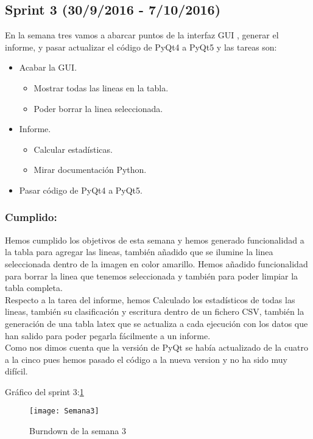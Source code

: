 \subsection{Sprint 3 (30/9/2016 - 7/10/2016)}
En la semana tres vamos a abarcar puntos de la interfaz GUI , generar el informe, y pasar actualizar  el código de PyQt4 a PyQt5 y las tareas son:

\begin{itemize}
	\item Acabar la GUI.
		\begin{itemize}
			\item Mostrar todas las lineas en la tabla.
			\item Poder borrar la linea seleccionada.
		\end{itemize} 
	\item Informe.
		\begin{itemize}
			\item Calcular estadísticas.
			\item Mirar documentación Python.
		\end{itemize}
	\item Pasar código de PyQt4 a PyQt5.
\end{itemize}
\subsubsection{Cumplido:}
Hemos cumplido los objetivos de esta semana y hemos generado funcionalidad a la tabla para agregar las lineas, también añadido que se ilumine la linea seleccionada dentro de la imagen en color amarillo. Hemos añadido funcionalidad para borrar la linea que tenemos seleccionada y también para poder limpiar la tabla completa.\\
Respecto a la tarea del informe, hemos Calculado los estadísticos de todas las lineas, también su clasificación y escritura dentro de un fichero CSV, también la generación de una tabla latex que se actualiza a cada ejecución con los datos que han salido para poder pegarla fácilmente a un informe.\\
Como nos dimos cuenta que la versión de PyQt se había actualizado de la cuatro a la cinco pues hemos pasado el código a la nueva version y no ha sido muy difícil.

Gráfico del sprint 3:\ref{fig:A.2.3}
\begin{figure}[h]
\centering
\texttt{[image: Semana3]}
\caption{Burndown de la semana 3}
\label{fig:A.2.3}
\end{figure}


